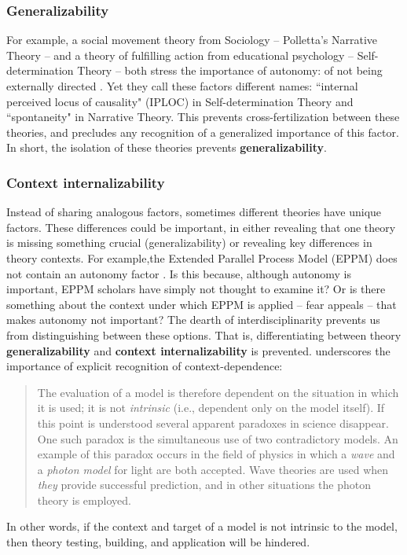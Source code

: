 \documentclass[12 pt]{article}
\begin{document}
 \subsubsection{Generalizability}
  For example, a social movement theory from Sociology -- Polletta's Narrative Theory -- and a theory of fulfilling action from educational psychology -- Self-determination Theory -- both stress the importance of autonomy: of not being externally directed \parencite{Polletta1998,Ryan2000,Ryan2000a}. Yet they call these factors different names: ``internal perceived locus of causality" (IPLOC) in Self-determination Theory \parencite{Ryan2000,Ryan2000a} and ``spontaneity" in Narrative Theory. This prevents cross-fertilization between these theories, and precludes any recognition of a generalized importance of this factor.  In short, the isolation of these theories prevents \textbf{generalizability}. 
 
 \subsubsection{Context internalizability} 
  Instead of sharing analogous factors, sometimes different theories have unique factors.  These differences could be important, in either revealing that one theory is missing something crucial (generalizability) or revealing key differences in theory contexts. For example,the Extended Parallel Process Model (EPPM) does not contain an autonomy factor \parencite{Maloney2011}. Is this because, although autonomy is important, EPPM scholars have simply not thought to examine it? Or is there something about the context under which EPPM is applied -- fear appeals -- that makes autonomy not important? The dearth of interdisciplinarity prevents us from distinguishing between these options.  That is, differentiating between theory \textbf{generalizability} and \textbf{context internalizability} is prevented. 
  \textcite[][p. 172]{Bross1953} underscores the importance of explicit recognition of context-dependence: \blockquote{The evaluation of a model is therefore dependent on the situation in which it is used; it is not \textit{intrinsic} (i.e., dependent only on the model itself). If this point is understood several apparent paradoxes in science disappear. One such paradox is the simultaneous use of two contradictory models. An example of this paradox occurs in the field of physics in which a \textit{wave} and a \textit{photon model} for light are both accepted. Wave theories are used when \textit{they} provide successful prediction, and in other situations the photon theory is employed.}
  In other words, if the context and target of a model is not intrinsic to the model, then theory testing, building, and application will be hindered. 
  
\end{document}
